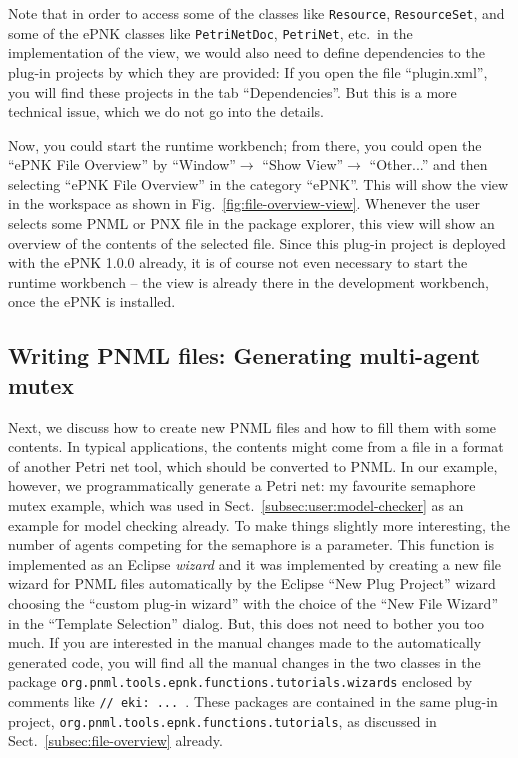 Note that in order to access some of the classes like {\tt Resource},
{\tt Resource\optsep{}Set}, and some of the ePNK classes like {\tt PetriNetDoc},
{\tt PetriNet}, etc.\ in the implementation of the view, we would also need to
define dependencies to the plug-in projects by which they are provided: If you
open the file ``plugin.xml'', you will find these projects in the tab ``Dependencies''.  But
this is a more technical issue, which we do not go into the details.

Now, you could start the runtime workbench; from there, you could open the
``ePNK File Overview'' by ``Window''$\rightarrow$ ``Show
View''$\rightarrow$ ``Other...'' and then selecting ``ePNK File Overview''
in the category ``ePNK''. This will show the view in the workspace as shown
in Fig.~\ref{fig:file-overview-view}. Whenever the user selects some
PNML or PNX file in the package explorer, this view will show an overview
of the contents of the selected file. Since this plug-in project is deployed
with the ePNK 1.0.0 already, it is of course not even necessary to start the
runtime workbench -- the view is already there in the development workbench,
once the ePNK is installed.


\subsection{Writing PNML files: Generating multi-agent mutex}
\label{subsect:multi-agent}

Next, we discuss how to create new PNML files and how to fill them
with some contents.
In typical applications, the contents might come from a file in a format of
another Petri net tool, which should be converted to PNML. In our example,
however, we programmatically generate a Petri net: my favourite semaphore mutex
example, which was used in Sect.~\ref{subsec:user:model-checker} as an
example for model checking already.
To make things slightly more interesting, the number of agents competing for the
semaphore is a parameter.  This function is implemented as an Eclipse
\emph{wizard}%
and it was implemented by creating a new file wizard for PNML files
automatically by the Eclipse ``New Plug Project'' wizard choosing the
``custom plug-in wizard'' with the choice of the ``New File Wizard'' in
the ``Template Selection'' dialog. But, this does not need to bother you too
much. If you are interested in the manual changes made to the automatically
generated code, you will find all the manual changes in the two classes
in the package {\tt org.pnml.tools.epnk.functions.tutorials.wizards} enclosed
by comments like {\tt // eki: ... }. These packages are contained in the
same plug-in project, 
{\tt org.pnml.tools.epnk.functions.tutorials},
as discussed in Sect.~\ref{subsec:file-overview} already.

